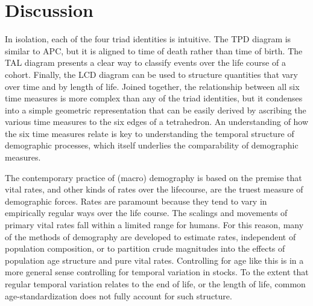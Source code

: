 \documentclass[12pt,oneside,a4paper]{article} %
\begin{document}
\section{Discussion}

In isolation, each of the four triad identities is intuitive. The TPD
diagram is similar to APC, but it is aligned to time of death rather than time of birth. The TAL diagram presents a clear way to classify events
over the life course of a cohort. Finally, the LCD diagram can be used to
structure quantities that vary over time and by length of life.
Joined together, the relationship between all six time measures is more
complex than any of the triad identities, but it condenses into a simple
geometric representation that can be easily derived by ascribing the various time measures to the six edges of a tetrahedron. An understanding of how the six time measures relate is
key to understanding the temporal structure of demographic processes, which
itself underlies the comparability of demographic measures.

The contemporary practice of (macro) demography is based on the premise that
vital rates, and other kinds of rates over the lifecourse, are the truest measure of
demographic forces. Rates are paramount because they tend to vary in
empirically regular ways over the life course. The scalings and movements of
primary vital rates fall within a limited range for humans. For this reason, many of the methods of
demography are developed to estimate rates, independent of population composition, or to
partition crude magnitudes into the effects of population age structure and
pure vital rates. Controlling for age like this is in a more general sense
controlling for temporal variation in stocks. To the extent that regular temporal variation
relates to the end of life, or the length of life, common
age-standardization does not fully account for such structure.
\end{document}
